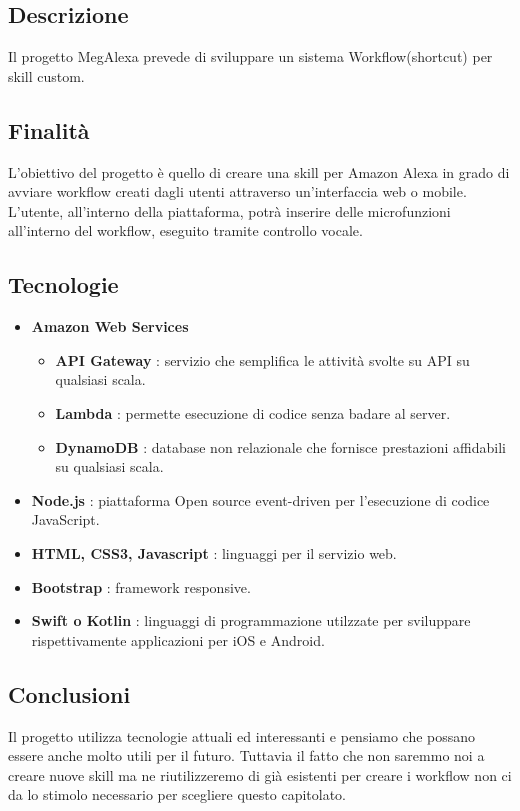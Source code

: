 \documentclass{article}
\begin{document}
		\subsection{Descrizione}
			Il progetto MegAlexa prevede di sviluppare un sistema Workflow(shortcut) per skill custom.
		\subsection{Finalità}
			L'obiettivo del progetto è quello di creare una skill per Amazon Alexa in grado di avviare workflow creati dagli utenti attraverso un'interfaccia web o mobile.
			L'utente, all'interno della piattaforma, potrà inserire delle microfunzioni all'interno del workflow, eseguito tramite controllo vocale.
		\subsection{Tecnologie}
			\begin{itemize}
				\item \textbf{Amazon Web Services}
					\begin{itemize}
						\item \textbf{API Gateway} : servizio che semplifica le attività svolte su API su qualsiasi scala.
						\item \textbf{Lambda} : permette esecuzione di codice senza badare al server.
						\item \textbf{DynamoDB} : database non relazionale che fornisce prestazioni affidabili su qualsiasi scala.
					\end{itemize}
				\item \textbf{Node.js} : piattaforma Open source event-driven per l'esecuzione di codice JavaScript.
				\item \textbf{HTML, CSS3, Javascript} : linguaggi per il servizio web.
				\item \textbf{Bootstrap} : framework responsive.
				\item \textbf{Swift o Kotlin} : linguaggi di programmazione utilzzate per sviluppare rispettivamente applicazioni per iOS e Android.
			\end{itemize}
		\subsection{Conclusioni}
			Il progetto utilizza tecnologie attuali ed interessanti e pensiamo che possano essere anche molto utili per il futuro. Tuttavia il fatto che non saremmo noi a creare nuove skill ma ne riutilizzeremo di già esistenti per creare i workflow non ci da lo stimolo necessario per scegliere questo capitolato.
			
\end{document}
